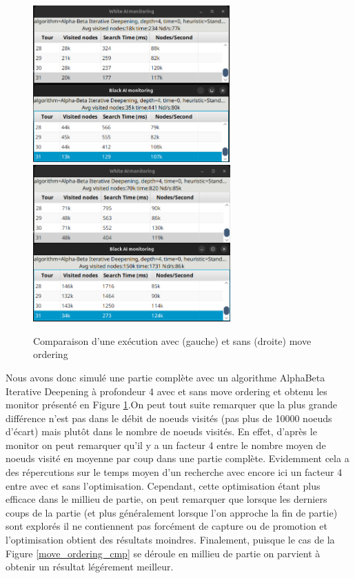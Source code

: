 \documentclass{article}
\begin{document}
\begin{figure}[h]
    \centering
    \includegraphics[width=\textwidth,height=6.0cm,keepaspectratio]{with_mo.png}
    \includegraphics[width=\textwidth,height=6.0cm,keepaspectratio]{without_mo.png}
    \caption{Comparaison d'une exécution avec (gauche) et sans (droite) move ordering}
    \label{move_ordering_cmp_monitor}
\end{figure}
\FloatBarrier

Nous avons donc simulé une partie complète avec un algorithme AlphaBeta Iterative Deepening à profondeur 4 avec et sans move ordering et obtenu les monitor
présenté en Figure \ref{move_ordering_cmp_monitor}.On peut tout suite remarquer que la plus grande différence n'est pas dans le débit de noeuds visités (pas plus de 10000 noeuds d'écart) mais plutôt dans le nombre de noeuds visités.
En effet, d'après le monitor on peut remarquer qu'il y a un facteur 4 entre le nombre moyen de noeuds visité en moyenne par coup dans une partie complète. Evidemment cela a des répercutions
sur le temps moyen d'un recherche avec encore ici un facteur 4 entre avec et sans l'optimisation. Cependant, cette optimisation étant plus efficace dans le millieu de partie, on peut remarquer
que lorsque les derniers coups de la partie (et plus généralement lorsque l'on approche la fin de partie) sont explorés il ne contiennent pas forcément de capture ou de promotion et l'optimisation
obtient des résultats moindres. Finalement, puisque le cas de la Figure \ref{move_ordering_cmp} se déroule en millieu de partie on parvient à obtenir un résultat légérement meilleur.
\end{document}
